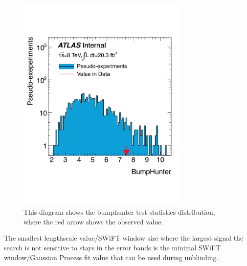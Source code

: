 \begin{figure}[!htb]
    \begin{center}
        \includegraphics[width=0.75\textwidth]{figures/chapter_analysismethod/bumphunter}
        \caption{
            This diagram shows the bumphunter test statistics distribution, where the red arrow shows the observed value. 
        }
        \label{fig:teststats}
    \end{center}
\end{figure}
\FloatBarrier
   

   The smallest lengthscale value/SWiFT window size where the largest signal the search is not sensitive to stays in the error bands is the minimal SWiFT window/Gaussian Process fit value that can be used during unblinding. 

